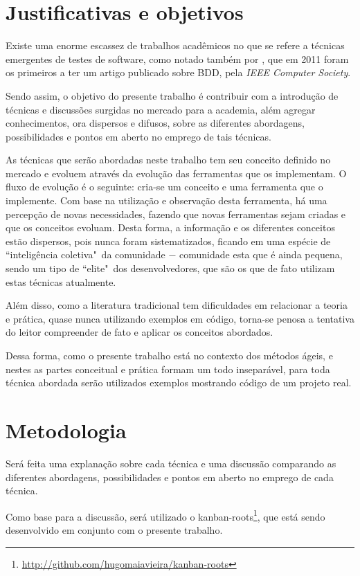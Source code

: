 \section{Justificativas e objetivos}

Existe uma enorme escassez de trabalhos acadêmicos no que se refere a técnicas emergentes de testes de software, como notado também por , que em 2011 foram os primeiros a ter um artigo publicado sobre BDD, pela \textit{IEEE Computer Society}.

Sendo assim, o objetivo do presente trabalho é contribuir com a introdução de técnicas e discussões surgidas no mercado para a academia, além agregar conhecimentos, ora dispersos e difusos, sobre as diferentes abordagens, possibilidades e pontos em aberto no emprego de tais técnicas.

As técnicas que serão abordadas neste trabalho tem seu conceito definido no mercado e evoluem através da evolução das ferramentas que os implementam. O fluxo de evolução é o seguinte: cria-se um conceito e uma ferramenta que o implemente. Com base na utilização e observação desta ferramenta, há uma percepção de novas necessidades, fazendo que novas ferramentas sejam criadas e que os conceitos evoluam. Desta forma, a informação e os diferentes conceitos estão dispersos, pois nunca foram sistematizados, ficando em uma espécie de ``inteligência coletiva"\ da comunidade $-$ comunidade esta que é ainda pequena, sendo um tipo de ``elite"\ dos desenvolvedores, que são os que de fato utilizam estas técnicas atualmente.

Além disso, como a literatura tradicional tem dificuldades em relacionar a teoria e prática, quase nunca utilizando exemplos em código, torna-se penosa a tentativa do leitor compreender de fato e aplicar os conceitos abordados.

Dessa forma, como o presente trabalho está no contexto dos métodos ágeis, e nestes as partes conceitual e prática formam um todo inseparável, para toda técnica abordada serão utilizados exemplos mostrando código de um projeto real.

\section{Metodologia}

Será feita uma explanação sobre cada técnica e uma discussão comparando as diferentes abordagens, possibilidades e pontos em aberto no emprego de cada técnica.

Como base para a discussão, será utilizado o kanban-roots\footnote{\url{http://github.com/hugomaiavieira/kanban-roots}}, que está sendo desenvolvido em conjunto com o presente trabalho.

